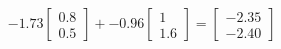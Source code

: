 \documentclass[preview]{standalone}
\begin{document}
\begin{align*}
-1.73 \begin{bmatrix} 0.8 \\ 0.5 \end{bmatrix} + -0.96 \begin{bmatrix} 1 \\ 1.6 \end{bmatrix} = \begin{bmatrix} -2.35 \\ -2.40 \end{bmatrix}
\end{align*}
\end{document}
